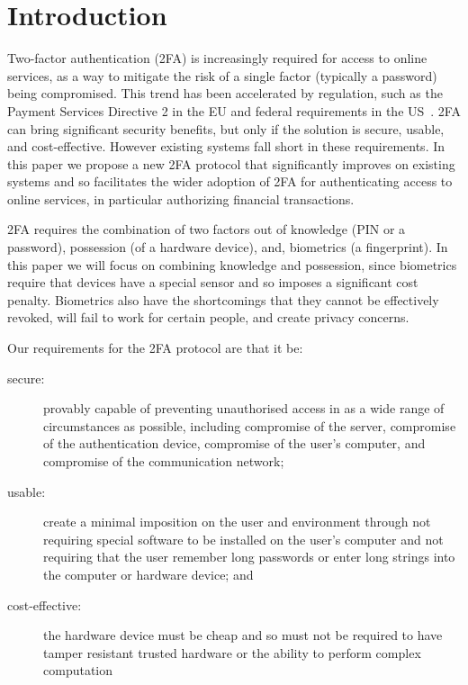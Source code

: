 


\section{Introduction}

Two-factor authentication (2FA) is increasingly required for access to online services, as a way to mitigate the risk of a single factor (typically a password) being compromised.
This trend has been accelerated by regulation, such as the Payment Services Directive 2 in the EU and federal requirements in the US~\cite{Zero-Trust-Cybersecurity}.
2FA can bring significant security benefits, but only if the solution is secure, usable, and cost-effective.
However existing systems fall short in these requirements.
In this paper we propose a new 2FA protocol that significantly improves on existing systems and so facilitates the wider adoption of 2FA for authenticating access to online services, in particular authorizing financial transactions.

2FA requires the combination of two factors out of knowledge (\eg PIN or a password), possession (\eg of a hardware device), and, biometrics (\eg a fingerprint).
In this paper we will focus on combining knowledge and possession, since biometrics require that devices have a special sensor and so imposes a significant cost penalty.
Biometrics also have the shortcomings that they cannot be effectively revoked, will fail to work for certain people, and create privacy concerns.

Our requirements for the 2FA protocol are that it be:
\begin{description}
\item[secure:] provably capable of preventing unauthorised access in as a wide range of circumstances as possible, including compromise of the server, compromise of the authentication device, compromise of the user's computer, and compromise of the communication network;
\item[usable:] create a minimal imposition on the user and environment through not requiring special software to be installed on the user's computer and not requiring that the user remember long passwords or enter long strings into the computer or hardware device; and
\item[cost-effective:] the hardware device must be cheap and so must not be required to have tamper resistant trusted hardware or the ability to perform complex computation
\end{description}

